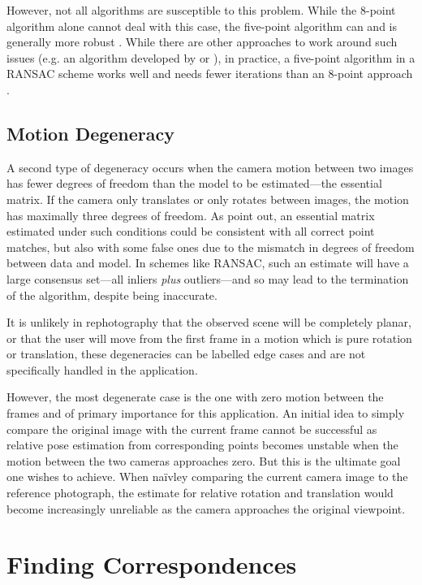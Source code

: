 However, not all algorithms are susceptible to this problem. While the 8-point
algorithm alone cannot deal with this case, the five-point algorithm can and is
generally more robust \citep{li2006}. While there are other approaches to work
around such issues (e.g. an algorithm developed by \citet{chum2005} or
\citet{decker2008}), in practice, a five-point algorithm in a RANSAC scheme
works well and needs fewer iterations than an 8-point approach \citep{li2006}.

\subsection{Motion Degeneracy}
\label{subsec:motion_degen}

A second type of degeneracy occurs when the camera motion between two images has
fewer degrees of freedom than the model to be estimated---the essential matrix.
If the camera only translates or only rotates between images, the motion has
maximally three degrees of freedom. As \citet{decker2008} point out, an
essential matrix estimated under such conditions could be consistent with all
correct point matches, but also with some false ones due to the mismatch in
degrees of freedom between data and model. In schemes like RANSAC, such an
estimate will have a large consensus set---all inliers \emph{plus}
outliers---and so may lead to the termination of the algorithm, despite being
inaccurate.

It is unlikely in rephotography that the observed scene will be completely
planar, or that the user will move from the first frame in a motion which is
pure rotation or translation, these degeneracies can be labelled edge cases and
are not specifically handled in the application.

However, the most degenerate case is the one with zero motion between the frames
and of primary importance for this application. An initial idea to simply
compare the original image with the current frame cannot be successful as
relative pose estimation from corresponding points becomes unstable when the
motion between the two cameras approaches zero. But this is the ultimate goal one
wishes to achieve. When na\"ivley comparing the current camera
image to the reference photograph, the estimate for relative rotation and
translation would become increasingly unreliable as the camera approaches the
original viewpoint.  

\section{Finding Correspondences}

